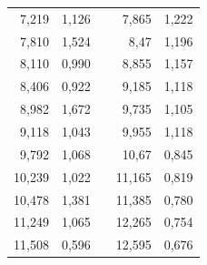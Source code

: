 \documentclass[14pt,a4paper]{scrartcl}
\begin{document}
\begin{center}
\begin{table}[]
\begin{tabular}{rrlrr}
7,219  & 1,126 &  & 7,865  & 1,222 \\
7,810  & 1,524 &  & 8,47   & 1,196 \\
8,110  & 0,990 &  & 8,855  & 1,157 \\
8,406  & 0,922 &  & 9,185  & 1,118 \\
8,982  & 1,672 &  & 9,735  & 1,105 \\
9,118  & 1,043 &  & 9,955  & 1,118 \\
9,792  & 1,068 &  & 10,67  & 0,845 \\
10,239 & 1,022 &  & 11,165 & 0,819 \\
10,478 & 1,381 &  & 11,385 & 0,780 \\
11,249 & 1,065 &  & 12,265 & 0,754 \\
11,508 & 0,596 &  & 12,595 & 0,676
\end{tabular}
\end{table}

\end{center}
\end{document}
